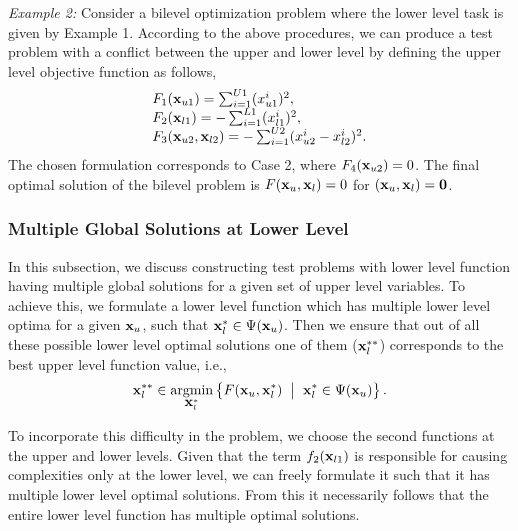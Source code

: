 \documentclass[twoside]{article}
\begin{document}
\textit{Example 2:} 
Consider a bilevel optimization problem where the lower level task is given by Example 1. According to the above procedures, we can produce a test problem with a conflict between the upper and lower level by defining the upper level objective function as follows,
\begin{equation}
\begin{array}{l}
F_1(\mbox{$\mathbf{x}$}_{u1}) = \sum_{i=1}^{U1} (x_{u1}^{i})^2,\\
F_2(\mbox{$\mathbf{x}$}_{l1}) =  -\sum_{i=1}^{L1} (x_{l1}^{i})^2,\\
F_3(\mbox{$\mathbf{x}$}_{u2}, \mbox{$\mathbf{x}$}_{l2}) = -\sum_{i=1}^{U2} (x_{u2}^{i} - x_{l2}^{i})^2.
\end{array}
\end{equation}
The chosen formulation corresponds to Case 2, where $F_4(\mbox{$\mathbf{x}$}_{u2})=0$. The final optimal solution of the bilevel problem is $F(\mbox{$\mathbf{x}$}_u,\mbox{$\mathbf{x}$}_l)=0$ for $(\mbox{$\mathbf{x}$}_u,\mbox{$\mathbf{x}$}_l)=\mbox{$\mathbf{0}$}$.

\subsubsection{Multiple Global Solutions at Lower Level}
In this subsection, we discuss constructing test problems with lower level function having multiple global solutions for a given set of upper level variables. To achieve this, we formulate a lower level function which has multiple lower level optima for a given $\mbox{$\mathbf{x}$}_{u}$, such that $\mbox{$\mathbf{x}$}_{l}^{*} \in \Psi(\mbox{$\mathbf{x}$}_{u})$. Then we ensure that out of all these possible lower level optimal solutions one of them ($\mbox{$\mathbf{x}$}_{l}^{**}$) corresponds to the best upper level function value, i.e.,
\begin{equation}
\mbox{$\mathbf{x}$}_{l}^{**} \in \underset{\mbox{$\mathbf{x}$}_{l}^{*}}{\mbox{argmin}} \left\lbrace F(\mbox{$\mathbf{x}$}_{u},\mbox{$\mathbf{x}$}_{l}^{*}) \hspace{2mm} \big| \hspace{2mm} \mbox{$\mathbf{x}$}_{l}^{*} \in \Psi(\mbox{$\mathbf{x}$}_{u}) \right\rbrace.
\end{equation}

To incorporate this difficulty in the problem, we choose the second functions at the upper and lower levels.  Given that the term $f_2(\mbox{$\mathbf{x}$}_{l1})$ is responsible for causing complexities only at the lower level, we can freely formulate it such that it has multiple lower level optimal solutions. From this it necessarily follows that the entire lower level function has multiple optimal solutions.
\end{document}
